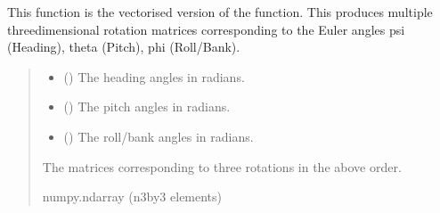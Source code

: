 \documentclass[letterpaper,10pt,english]{sphinxmanual}
\begin{document}
\begin{fulllineitems}
\label{\detokenize{modules/util/transformations:qnav.util.transformations.rotate_3d_vec}}
\pysigstartsignatures
{}
\pysigstopsignatures
\sphinxAtStartPar
This function is the vectorised version of the
{\hyperref[\detokenize{modules/util/transformations:qnav.util.transformations.rotate_3d}]{}} function. This
produces multiple three\sphinxhyphen{}dimensional rotation matrices corresponding
to the Euler angles psi (Heading), theta (Pitch), phi (Roll/Bank).
\begin{quote}\begin{description}
\begin{itemize}
\item {} 
\sphinxAtStartPar
{} () \textendash{} The heading angles in radians.

\item {} 
\sphinxAtStartPar
{} () \textendash{} The pitch angles in radians.

\item {} 
\sphinxAtStartPar
{} () \textendash{} The roll/bank angles in radians.

\end{itemize}

\sphinxAtStartPar
The matrices corresponding to three rotations in the above order.

\sphinxAtStartPar
numpy.ndarray (n\sphinxhyphen{}3\sphinxhyphen{}by\sphinxhyphen{}3 elements)

\end{description}\end{quote}

\end{fulllineitems}
\end{document}
